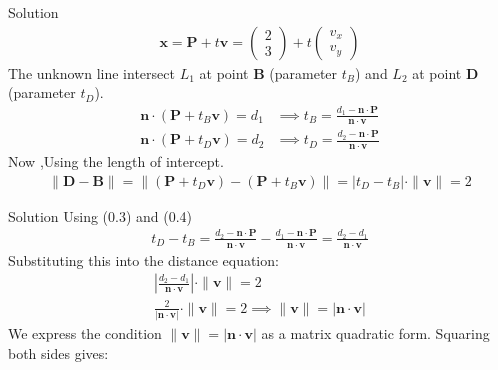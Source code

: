 \documentclass{beamer}
\newcommand{\myvec}[1]{\ensuremath{\begin{pmatrix}#1\end{pmatrix}}}
\begin{document}
\begin{frame}{Solution}
\begin{align} \mathbf{x} = \mathbf{P} + t\mathbf{v} = \myvec{2 \\ 3} + t \myvec{v_x \\ v_y} \end{align}
The unknown line intersect $L_1$ at point $\mathbf{B}$ (parameter $t_B$) and $L_2$ at point $\mathbf{D}$ (parameter $t_D$).
\begin{align}
	\mathbf{n} \cdot (\mathbf{P} + t_B \mathbf{v}) = d_1 &\implies t_B = \frac{d_1 - \mathbf{n} \cdot \mathbf{P}}{\mathbf{n} \cdot \mathbf{v}} \\
	\mathbf{n} \cdot (\mathbf{P} + t_D \mathbf{v}) = d_2 &\implies t_D = \frac{d_2 - \mathbf{n} \cdot \mathbf{P}}{\mathbf{n} \cdot \mathbf{v}}
\end{align}
Now ,Using the length of intercept.\\
\begin{align}
	\|\mathbf{D} - \mathbf{B}\| = \|(\mathbf{P} + t_D \mathbf{v}) - (\mathbf{P} + t_B \mathbf{v})\| = |t_D - t_B| \cdot \|\mathbf{v}\| = 2
\end{align} 	
\end{frame}

\begin{frame}{Solution}
Using (0.3) and (0.4)\\
\begin{align}
	t_D - t_B = \frac{d_2 - \mathbf{n} \cdot \mathbf{P}}{\mathbf{n} \cdot \mathbf{v}} - \frac{d_1 - \mathbf{n} \cdot \mathbf{P}}{\mathbf{n} \cdot \mathbf{v}} = \frac{d_2 - d_1}{\mathbf{n} \cdot \mathbf{v}}
\end{align}
Substituting this into the distance equation:
\begin{align}
	\left| \frac{d_2 - d_1}{\mathbf{n} \cdot \mathbf{v}} \right| \cdot \|\mathbf{v}\| = 2 \\
	\frac{2}{|\mathbf{n} \cdot \mathbf{v}|} \cdot \|\mathbf{v}\| = 2 \implies \|\mathbf{v}\| = |\mathbf{n} \cdot \mathbf{v}| 
\end{align}
We express the condition $\|\mathbf{v}\| = |\mathbf{n} \cdot \mathbf{v}|$ as a matrix quadratic form. Squaring both sides gives:
\end{frame}
\end{document}
